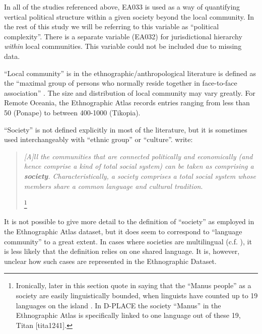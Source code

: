 \documentclass[12pt,letterpaper]{article}
\begin{document}
In all of the studies referenced above, EA033 is used as a way of quantifying vertical political structure within a given society beyond the local community. In the rest of this study we will be referring to this variable as ``political complexity''. There is a separate variable (EA032) for jurisdictional hierarchy \emph{within} local communities. This variable could not be included due to missing data. 

``Local community'' is in the ethnographic/anthropological literature is defined as the ``maximal group of persons who normally reside together in face-to-face association'' \citep{yale1945outline}. The size and distribution of local community may vary greatly. For Remote Oceania, the Ethnographic Atlas records entries ranging from less than 50 (Ponape) to between 400-1000 (Tikopia).

``Society'' is not defined explicitly in most of the literature, but it is sometimes used interchangeably with ``ethnic group'' or ``culture''. \citet{roger1981cultural} write:

\begin{quotation}
\noindent\emph{[A]ll the communities that are connected politically and economically (and hence comprise a kind of total social system) can be taken as comprising a \textbf{society}. Characteristically, a society comprises a total social system whose members share a common language and cultural tradition}. 
\begin{flushright}
\citep[22]{roger1981cultural} \footnote{Ironically, later in this section \citet[23]{roger1981cultural} quote \citet[422]{schwartz1978culture} in saying that the ``Manus people'' as a society are easily linguistically bounded, when linguists have counted up to 19 languages on the island \citep{glottolog40}. In D-PLACE \citep{d_place_all} the society ``Manus'' in the Ethnographic Atlas is specifically linked to one language out of these 19, Titan [tita1241].} 

\end{flushright}
 \end{quotation}

It is not possible to give more detail to the definition of ``society'' as employed in the Ethnographic Atlas dataset, but it does seem to correspond to ``language community'' to a great extent. In cases where societies are multilingual (c.f. \citet{evans2017did}), it is less likely that the definition relies on one shared language. It is, however, unclear how such cases are represented in the Ethnographic Dataset.
\end{document}
